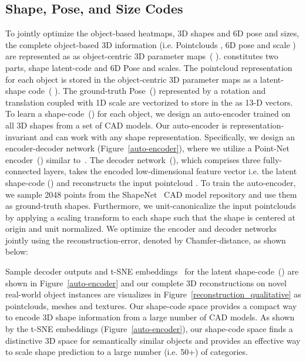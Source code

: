 \documentclass[letter, 10pt, conference]{ieeeconf}
\begin{document}
\subsection{Shape, Pose, and Size Codes}
\label{shapecode}
To jointly optimize the object-based heatmaps, 3D shapes and 6D pose and sizes, the complete object-based 3D information (i.e. Pointclouds , 6D pose  and scale ) are represented as as object-centric 3D parameter maps~(  ).  constitutes two parts, shape latent-code and 6D Pose and scales. The pointcloud representation for each object is stored in the object-centric 3D parameter maps as a latent-shape code~(  ). The ground-truth Pose~() represented by a  rotation    and translation    coupled with 1D scale  are vectorized to store in the  as 13-D vectors. To learn a shape-code~() for each object, we design an auto-encoder trained on all 3D shapes from a set of CAD models. Our auto-encoder is representation-invariant and can work with any shape representation. Specifically, we design an encoder-decoder network (Figure~\ref{auto-encoder}), where we utilize a Point-Net encoder~() similar to~\cite{qi2017pointnet}. The decoder network~(), which comprises three fully-connected layers, takes the encoded low-dimensional feature vector i.e. the latent shape-code () and reconstructs the input pointcloud . To train the auto-encoder, we sample 2048 points from the ShapeNet~\cite{chang2015ShapeNet} CAD model repository and use them as ground-truth shapes. Furthermore, we unit-canonicalize the input pointclouds by applying a scaling transform to each shape such that the shape is centered at origin and unit normalized. We optimize the encoder and decoder networks jointly using the reconstruction-error, denoted by Chamfer-distance, as shown below:

Sample decoder outputs and t-SNE embeddings~\cite{van2008visualizing} for the latent shape-code~() are shown in Figure~\ref{auto-encoder} and our complete 3D reconstructions on novel real-world object instances are visualizes in Figure~\ref{reconstruction_qualitative} as pointclouds, meshes and textures. Our shape-code space provides a compact way to encode 3D shape information from a large number of CAD models. As shown by the t-SNE embeddings (Figure~\ref{auto-encoder}), our shape-code space finds a distinctive 3D space for semantically similar objects and provides an effective way to scale shape prediction to a large number (i.e. 50+) of categories.
\end{document}
